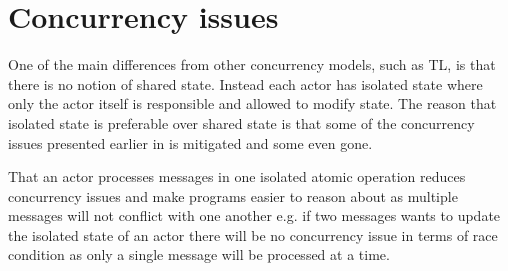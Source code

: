 \section{Concurrency issues}\label{sec:actor_con_issues}
One of the main differences from other concurrency models, such as \ac{TL}, is that there is no notion of shared state. Instead each actor has isolated state where only the actor itself is responsible and allowed to modify state. The reason that isolated state is preferable over shared state is that some of the concurrency issues presented earlier in  is mitigated and some even gone. 

That an actor processes messages in one isolated atomic operation reduces concurrency issues and make programs easier to reason about as multiple messages will not conflict with one another e.g. if two messages wants to update the isolated state of an actor there will be no concurrency issue in terms of race condition as only a single message will be processed at a time.











